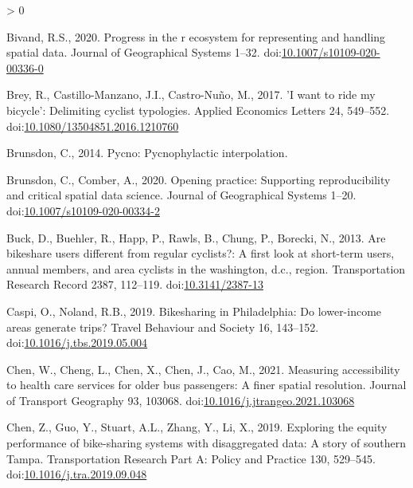 \documentclass[]{elsarticle} %
\newlength{\cslhangindent}
\newenvironment{CSLReferences}[2] %
 {%
  \setlength{\parindent}{0pt}
  \ifodd #1 \everypar{\setlength{\hangindent}{\cslhangindent}}\ignorespaces\fi
  \ifnum #2 > 0
  \setlength{\parskip}{#2\baselineskip}
  \fi
 }%
 {}
\begin{document}
\begin{CSLReferences}{1}{0}
\leavevmode\hypertarget{ref-bivand2020progress}{}%
Bivand, R.S., 2020. Progress in the r ecosystem for representing and
handling spatial data. Journal of Geographical Systems 1--32.
doi:\href{https://doi.org/10.1007/s10109-020-00336-0}{10.1007/s10109-020-00336-0}

\leavevmode\hypertarget{ref-breyWantRideMy2017}{}%
Brey, R., Castillo-Manzano, J.I., Castro-Nuño, M., 2017. 'I want to ride
my bicycle': Delimiting cyclist typologies. Applied Economics Letters
24, 549--552.
doi:\href{https://doi.org/10.1080/13504851.2016.1210760}{10.1080/13504851.2016.1210760}

\leavevmode\hypertarget{ref-R-pycno}{}%
Brunsdon, C., 2014. Pycno: Pycnophylactic interpolation.

\leavevmode\hypertarget{ref-brunsdon2020opening}{}%
Brunsdon, C., Comber, A., 2020. Opening practice: Supporting
reproducibility and critical spatial data science. Journal of
Geographical Systems 1--20.
doi:\href{https://doi.org/10.1007/s10109-020-00334-2}{10.1007/s10109-020-00334-2}

\leavevmode\hypertarget{ref-buckAreBikeshareUsers2013}{}%
Buck, D., Buehler, R., Happ, P., Rawls, B., Chung, P., Borecki, N.,
2013. Are bikeshare users different from regular cyclists?: A first look
at short-term users, annual members, and area cyclists in the
washington, d.c., region. Transportation Research Record 2387, 112--119.
doi:\href{https://doi.org/10.3141/2387-13}{10.3141/2387-13}

\leavevmode\hypertarget{ref-caspiBikesharingPhiladelphiaLowerincome2019}{}%
Caspi, O., Noland, R.B., 2019. Bikesharing in {Philadelphia}: {Do}
lower-income areas generate trips? Travel Behaviour and Society 16,
143--152.
doi:\href{https://doi.org/10.1016/j.tbs.2019.05.004}{10.1016/j.tbs.2019.05.004}

\leavevmode\hypertarget{ref-chenMeasuringAccessibilityHealth2021}{}%
Chen, W., Cheng, L., Chen, X., Chen, J., Cao, M., 2021. Measuring
accessibility to health care services for older bus passengers: {A}
finer spatial resolution. Journal of Transport Geography 93, 103068.
doi:\href{https://doi.org/10.1016/j.jtrangeo.2021.103068}{10.1016/j.jtrangeo.2021.103068}

\leavevmode\hypertarget{ref-chenExploringEquityPerformance2019}{}%
Chen, Z., Guo, Y., Stuart, A.L., Zhang, Y., Li, X., 2019. Exploring the
equity performance of bike-sharing systems with disaggregated data: {A}
story of southern {Tampa}. Transportation Research Part A: Policy and
Practice 130, 529--545.
doi:\href{https://doi.org/10.1016/j.tra.2019.09.048}{10.1016/j.tra.2019.09.048}


\end{CSLReferences}
\end{document}
